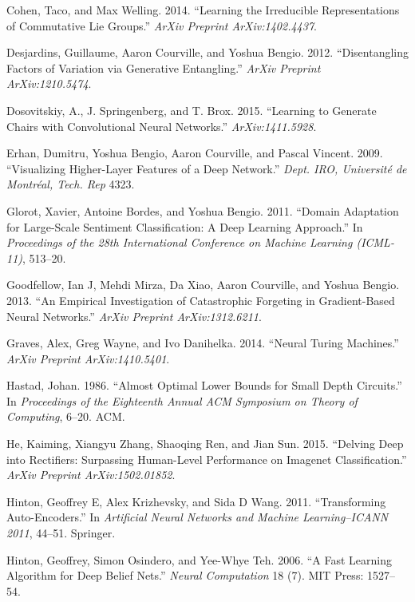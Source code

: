 \documentclass[12pt,twoside]{mitthesis}
\begin{document}
\hypertarget{ref-cohen2014learning}{}
Cohen, Taco, and Max Welling. 2014. ``Learning the Irreducible
Representations of Commutative Lie Groups.'' \emph{ArXiv Preprint
ArXiv:1402.4437}.

\hypertarget{ref-desjardins2012disentangling}{}
Desjardins, Guillaume, Aaron Courville, and Yoshua Bengio. 2012.
``Disentangling Factors of Variation via Generative Entangling.''
\emph{ArXiv Preprint ArXiv:1210.5474}.

\hypertarget{ref-dosovitskiy2015learning}{}
Dosovitskiy, A., J. Springenberg, and T. Brox. 2015. ``Learning to
Generate Chairs with Convolutional Neural Networks.''
\emph{ArXiv:1411.5928}.

\hypertarget{ref-erhan2009visualizing}{}
Erhan, Dumitru, Yoshua Bengio, Aaron Courville, and Pascal Vincent.
2009. ``Visualizing Higher-Layer Features of a Deep Network.''
\emph{Dept. IRO, Université de Montréal, Tech. Rep} 4323.

\hypertarget{ref-glorot2011domain}{}
Glorot, Xavier, Antoine Bordes, and Yoshua Bengio. 2011. ``Domain
Adaptation for Large-Scale Sentiment Classification: A Deep Learning
Approach.'' In \emph{Proceedings of the 28th International Conference on
Machine Learning (ICML-11)}, 513--20.

\hypertarget{ref-goodfellow2013empirical}{}
Goodfellow, Ian J, Mehdi Mirza, Da Xiao, Aaron Courville, and Yoshua
Bengio. 2013. ``An Empirical Investigation of Catastrophic Forgeting in
Gradient-Based Neural Networks.'' \emph{ArXiv Preprint ArXiv:1312.6211}.

\hypertarget{ref-graves2014neural}{}
Graves, Alex, Greg Wayne, and Ivo Danihelka. 2014. ``Neural Turing
Machines.'' \emph{ArXiv Preprint ArXiv:1410.5401}.

\hypertarget{ref-hastad1986almost}{}
Hastad, Johan. 1986. ``Almost Optimal Lower Bounds for Small Depth
Circuits.'' In \emph{Proceedings of the Eighteenth Annual ACM Symposium
on Theory of Computing}, 6--20. ACM.

\hypertarget{ref-he2015delving}{}
He, Kaiming, Xiangyu Zhang, Shaoqing Ren, and Jian Sun. 2015. ``Delving
Deep into Rectifiers: Surpassing Human-Level Performance on Imagenet
Classification.'' \emph{ArXiv Preprint ArXiv:1502.01852}.

\hypertarget{ref-hinton2011transforming}{}
Hinton, Geoffrey E, Alex Krizhevsky, and Sida D Wang. 2011.
``Transforming Auto-Encoders.'' In \emph{Artificial Neural Networks and
Machine Learning--ICANN 2011}, 44--51. Springer.

\hypertarget{ref-hinton2006fast}{}
Hinton, Geoffrey, Simon Osindero, and Yee-Whye Teh. 2006. ``A Fast
Learning Algorithm for Deep Belief Nets.'' \emph{Neural Computation} 18
(7). MIT Press: 1527--54.
\end{document}
